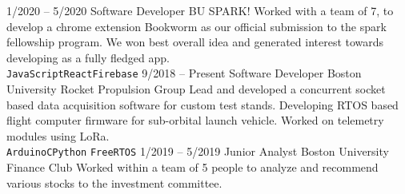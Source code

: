 \documentclass[9pt]{developercv} %
\begin{document}
\begin{entrylist}
	\entry
		{1/2020 -- 5/2020}
		{Software Developer}
		{BU SPARK!}
		{Worked with a team of 7, to develop a chrome extension Bookworm as our official submission to the spark fellowship program.
		We won best overall idea and generated interest towards developing as a fully fledged app.\\
		\texttt{JavaScript}\slashsep\texttt{React}\slashsep\texttt{Firebase}}
	\entry
		{9/2018 -- Present}
		{Software Developer}
		{Boston University Rocket Propulsion Group}
		{Lead and developed a concurrent socket based data acquisition software for custom test stands.
		Developing RTOS based flight computer firmware for sub-orbital launch vehicle. Worked 
		on telemetry modules using LoRa. \\\texttt{Arduino}\slashsep\texttt{C}\slashsep\texttt{Python}
		\slashsep\texttt{FreeRTOS}}
	\entry
		{1/2019 -- 5/2019}
		{Junior Analyst}
		{Boston University Finance Club}
		{Worked within a team of 5 people to analyze and recommend various stocks to the investment committee.}
		
\end{entrylist}
\end{document}
